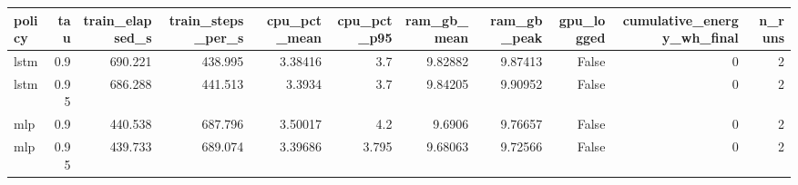 \begin{tabular}{lrrrrrrrrrr}
\toprule
policy & tau & train_elapsed_s & train_steps_per_s & cpu_pct_mean & cpu_pct_p95 & ram_gb_mean & ram_gb_peak & gpu_logged & cumulative_energy_wh_final & n_runs \\
\midrule
lstm & 0.9 & 690.221 & 438.995 & 3.38416 & 3.7 & 9.82882 & 9.87413 & False & 0 & 2 \\
lstm & 0.95 & 686.288 & 441.513 & 3.3934 & 3.7 & 9.84205 & 9.90952 & False & 0 & 2 \\
mlp & 0.9 & 440.538 & 687.796 & 3.50017 & 4.2 & 9.6906 & 9.76657 & False & 0 & 2 \\
mlp & 0.95 & 439.733 & 689.074 & 3.39686 & 3.795 & 9.68063 & 9.72566 & False & 0 & 2 \\
\bottomrule
\end{tabular}
